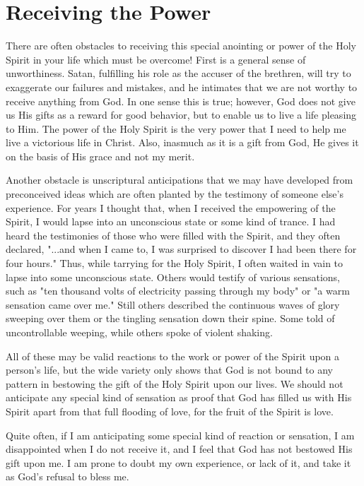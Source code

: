 \chapter{Receiving the Power}

There are often obstacles to receiving this special anointing or power of the Holy Spirit in your life which must be overcome! First is a general sense of unworthiness. Satan, fulfilling his role as the accuser of the brethren, will try to exaggerate our failures and mistakes, and he intimates that we are not worthy to receive anything from God. In one sense this is true; however, God does not give us His gifts as a reward for good behavior, but to enable us to live a life pleasing to Him. The power of the Holy Spirit is the very power that I need to help me live a victorious life in Christ. Also, inasmuch as it is a gift from God, He gives it on the basis of His grace and not my merit. 

Another obstacle is unscriptural anticipations that we may have developed from preconceived ideas which are often planted by the testimony of someone else's experience. For years I thought that, when I received the empowering of the Spirit, I would lapse into an unconscious state or some kind of trance. I had heard the testimonies of those who were filled with the Spirit, and they often declared, "...and when I came to, I was surprised to discover I had been there for four hours." Thus, while tarrying for the Holy Spirit, I often waited in vain to lapse into some unconscious state. Others would testify of various sensations, such as "ten thousand volts of electricity passing through my body" or "a warm sensation came over me." Still others described the continuous waves of glory sweeping over them or the tingling sensation down their spine. Some told of uncontrollable weeping, while others spoke of violent shaking. 

All of these may be valid reactions to the work or power of the Spirit upon a person's life, but the wide variety only shows that God is not bound to any pattern in bestowing the gift of the Holy Spirit upon our lives. We should not anticipate any special kind of sensation as proof that God has filled us with His Spirit apart from that full flooding of love, for the fruit of the Spirit is love. 

Quite often, if I am anticipating some special kind of reaction or sensation, I am disappointed when I do not receive it, and I feel that God has not bestowed His gift upon me. I am prone to doubt my own experience, or lack of it, and take it as God's refusal to bless me. 

